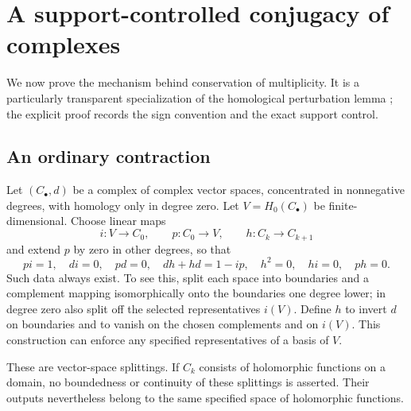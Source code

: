 \documentclass[11pt]{article}
\theoremstyle{definition}
\begin{document}
\section{A support-controlled conjugacy of complexes}\label{sec:contraction}
We now prove the mechanism behind conservation of multiplicity. It is a particularly transparent specialization of the homological perturbation lemma \cite{Crainic}; the explicit proof records the sign convention and the exact support control.

\subsection{An ordinary contraction}
Let $(C_\bullet,d)$ be a complex of complex vector spaces, concentrated in nonnegative degrees, with homology only in degree zero. Let $V=H_0(C_\bullet)$ be finite-dimensional. Choose linear maps
\[
 i:V\to C_0,\qquad p:C_0\to V,\qquad h:C_k\to C_{k+1}
\]
and extend $p$ by zero in other degrees, so that
\begin{equation}\label{eq:contraction}
 pi=1,\quad di=0,\quad pd=0,\quad
 dh+hd=1-ip,\quad h^2=0,\quad hi=0,\quad ph=0.
\end{equation}
Such data always exist. To see this, split each space into boundaries and a complement mapping isomorphically onto the boundaries one degree lower; in degree zero also split off the selected representatives $i(V)$. Define $h$ to invert $d$ on boundaries and to vanish on the chosen complements and on $i(V)$. This construction can enforce any specified representatives of a basis of $V$.

These are vector-space splittings. If $C_k$ consists of holomorphic functions on a domain, no boundedness or continuity of these splittings is asserted. Their outputs nevertheless belong to the same specified space of holomorphic functions.
\end{document}
